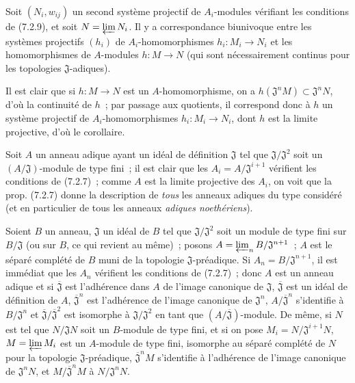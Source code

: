 \begin{corollary}[7.2.10]
\label{0.7.2.10-fr}
Soit $(N_i,w_{ij})$ un second système projectif de $A_i$-modules vérifiant les
conditions de \textup{(7.2.9)}, et soit $N=\varprojlim N_i$. Il y a correspondance
biunivoque entre les systèmes projectifs $(h_i)$ de $A_i$-homomorphismes
$h_i:M_i\to N_i$ et les homomorphismes de $A$-modules $h:M\to N$ (qui sont
nécessairement continus pour les topologies $\mathfrak J$-adiques).
\end{corollary}

Il est clair que si $h:M\to N$ est un $A$-homomorphisme, on a
$h(\mathfrak J^nM)\subset\mathfrak J^nN$, d'où la continuité de $h$~; par
passage aux quotients, il correspond donc à $h$ un système projectif de
$A_i$-homomorphismes $h_i:M_i\to N_i$, dont $h$ est la limite projective,
d'où le corollaire.

\begin{remark}[7.2.11]
\label{0.7.2.11-fr}
Soit $A$ un anneau adique ayant un idéal de définition $\mathfrak J$ tel que
$\mathfrak J/\mathfrak J^2$ soit un $(A/\mathfrak J)$-module de type fini~;
il est clair que les $A_i=A/\mathfrak J^{i+1}$ vérifient
les conditions de (7.2.7)~; comme $A$ est la limite projective des $A_i$, on
voit que la prop. (7.2.7) donne la description de \emph{tous} les anneaux
adiques du type considéré (et en particulier de tous les anneaux
\emph{adiques noethériens}).
\end{remark}

\begin{example}[7.2.12]
\label{0.7.2.12-fr}
Soient $B$ un anneau, $\mathfrak J$ un idéal de $B$ tel que
$\mathfrak J/\mathfrak J^2$ soit un module de type fini sur
$B/\mathfrak J$ (ou sur $B$, ce qui revient au même)~; posons
$A=\varprojlim_n B/\mathfrak J^{n+1}$~; $A$ est le séparé complété de $B$
muni de la topologie $\mathfrak J$-préadique. Si
$A_n=B/\mathfrak J^{n+1}$, il est immédiat que les $A_n$ vérifient les
conditions de (7.2.7)~; donc $A$ est un anneau adique et si
$\overline{\mathfrak J}$ est l'adhérence dans $A$ de l'image canonique de
$\mathfrak J$, $\overline{\mathfrak J}$ est un idéal de définition de $A$,
$\overline{\mathfrak J}^n$ est l'adhérence de l'image canonique de
$\mathfrak J^n$, $A/\overline{\mathfrak J}^n$ s'identifie à
$B/\mathfrak J^n$ et
$\overline{\mathfrak J}/\overline{\mathfrak J}^2$ est isomorphe à
$\mathfrak J/\mathfrak J^2$ en tant que
$(A/\overline{\mathfrak J})$-module. De même, si $N$ est tel que
$N/\mathfrak JN$ soit un $B$-module de type fini, et si on pose
$M_i=N/\mathfrak J^{i+1}N$, $M=\varprojlim M_i$ est un $A$-module de type
fini, isomorphe au séparé complété de $N$ pour la topologie
$\mathfrak J$-préadique, $\overline{\mathfrak J}^nM$ s'identifie à
l'adhérence de l'image canonique de $\mathfrak J^nN$, et
$M/\overline{\mathfrak J}^nM$ à $N/\mathfrak J^nN$.
\end{example}

